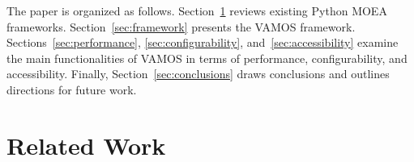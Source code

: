 \documentclass[journal]{IEEEtran}
\begin{document}
The paper is organized as follows. Section~\ref{sec:related} reviews existing Python MOEA frameworks. Section~\ref{sec:framework} presents the VAMOS framework. Sections~\ref{sec:performance}, \ref{sec:configurability}, and~\ref{sec:accessibility} examine the main functionalities of VAMOS in terms of performance, configurability, and accessibility. Finally, Section~\ref{sec:conclusions} draws conclusions and outlines directions for future work.

\section{Related Work} \label{sec:related}
\end{document}
